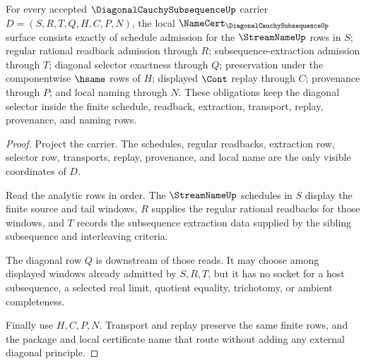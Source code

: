 \begin{theorem}
\label{thm:diagonal-cauchy-subsequence-namecert-obligations}
For every accepted $\DiagonalCauchySubsequenceUp$ carrier $D=(S,R,T,Q,H,C,P,N)$, the local $\NameCert_{\DiagonalCauchySubsequenceUp}$ surface consists exactly of schedule admission for the $\StreamNameUp$ rows in $S$; regular rational readback admission through $R$; subsequence-extraction admission through $T$; diagonal selector exactness through $Q$; preservation under the componentwise $\hsame$ rows of $H$; displayed $\Cont$ replay through $C$; provenance through $P$; and local naming through $N$. These obligations keep the diagonal selector inside the finite schedule, readback, extraction, transport, replay, provenance, and naming rows.
\end{theorem}
\begin{proof}
Project the carrier. The schedules, regular readbacks, extraction row, selector row, transports, replay, provenance, and local name are the only visible coordinates of $D$.

Read the analytic rows in order. The $\StreamNameUp$ schedules in $S$ display the finite source and tail windows, $R$ supplies the regular rational readbacks for those windows, and $T$ records the subsequence extraction data supplied by the sibling subsequence and interleaving criteria.

The diagonal row $Q$ is downstream of those reads. It may choose among displayed windows already admitted by $S,R,T$, but it has no socket for a host subsequence, a selected real limit, quotient equality, trichotomy, or ambient completeness.

Finally use $H,C,P,N$. Transport and replay preserve the same finite rows, and the package and local certificate name that route without adding any external diagonal principle.
\end{proof}

